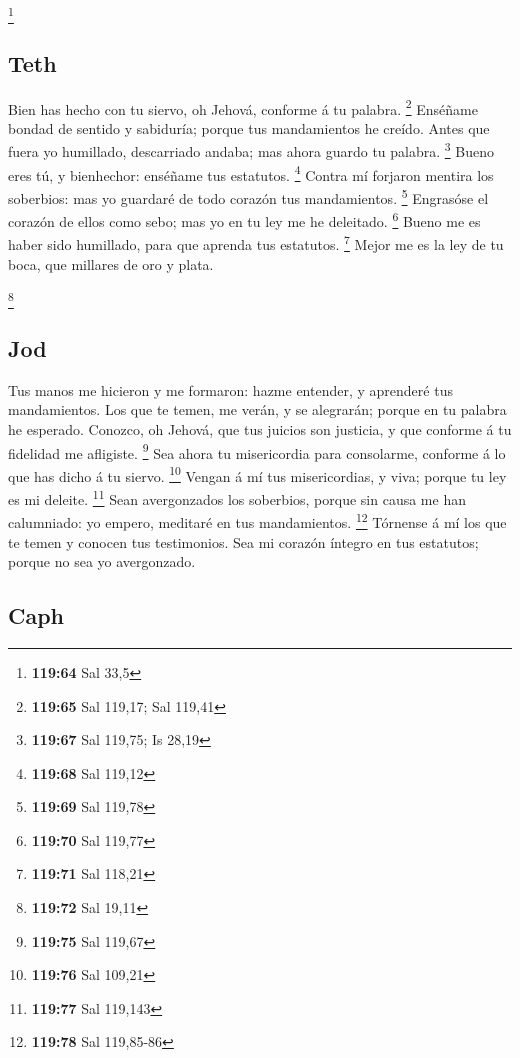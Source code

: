 \footnote{\textbf{119:64} Sal 33,5}

\hypertarget{teth}{%
\subsection{Teth}\label{teth}}

 Bien has hecho con tu siervo, oh Jehová, conforme á tu
palabra. \footnote{\textbf{119:65} Sal 119,17; Sal 119,41} 
Enséñame bondad de sentido y sabiduría; porque tus mandamientos he
creído.  Antes que fuera yo humillado, descarriado andaba;
mas ahora guardo tu palabra. \footnote{\textbf{119:67} Sal 119,75; Is
  28,19}  Bueno eres tú, y bienhechor: enséñame tus
estatutos. \footnote{\textbf{119:68} Sal 119,12}  Contra mí
forjaron mentira los soberbios: mas yo guardaré de todo corazón tus
mandamientos. \footnote{\textbf{119:69} Sal 119,78} 
Engrasóse el corazón de ellos como sebo; mas yo en tu ley me he
deleitado. \footnote{\textbf{119:70} Sal 119,77}  Bueno me
es haber sido humillado, para que aprenda tus estatutos. \footnote{\textbf{119:71}
  Sal 118,21}  Mejor me es la ley de tu boca, que millares
de oro y plata.

\footnote{\textbf{119:72} Sal 19,11}

\hypertarget{jod}{%
\subsection{Jod}\label{jod}}

 Tus manos me hicieron y me formaron: hazme entender, y
aprenderé tus mandamientos.  Los que te temen, me verán, y
se alegrarán; porque en tu palabra he esperado.  Conozco,
oh Jehová, que tus juicios son justicia, y que conforme á tu fidelidad
me afligiste. \footnote{\textbf{119:75} Sal 119,67}  Sea
ahora tu misericordia para consolarme, conforme á lo que has dicho á tu
siervo. \footnote{\textbf{119:76} Sal 109,21}  Vengan á mí
tus misericordias, y viva; porque tu ley es mi deleite. \footnote{\textbf{119:77}
  Sal 119,143}  Sean avergonzados los soberbios, porque sin
causa me han calumniado: yo empero, meditaré en tus mandamientos.
\footnote{\textbf{119:78} Sal 119,85-86}  Tórnense á mí los
que te temen y conocen tus testimonios.  Sea mi corazón
íntegro en tus estatutos; porque no sea yo avergonzado.

\hypertarget{caph}{%
\subsection{Caph}\label{caph}}

